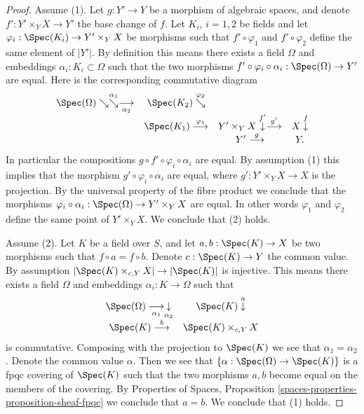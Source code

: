 \begin{proof}
Assume (1). Let $g : Y' \to Y$ be a morphism of algebraic
spaces, and denote $f' : Y' \times_Y X \to Y'$ the base change of $f$.
Let $K_i$, $i = 1, 2$ be fields and let
$\varphi_i : \Spec(K_i) \to Y' \times_Y X$ be morphisms
such that $f' \circ \varphi_1$ and $f' \circ \varphi_2$ define the
same element of $|Y'|$. By definition this means there exists a
field $\Omega$ and embeddings $\alpha_i : K_i \subset \Omega$ such that
the two morphisms
$f' \circ \varphi_i \circ \alpha_i : \Spec(\Omega) \to Y'$ are equal.
Here is the corresponding commutative diagram
$$
\begin{array}{cccc}\Spec(\Omega) \searrow\overset{\alpha_1}{\searrow}\underset{\alpha_2}{\longrightarrow} & \Spec(K_2) \overset{\varphi_2}{\searrow} &  &  \\  & \Spec(K_1) \overset{\varphi_1}{\longrightarrow} & Y' \times_Y X  \overset{f'}{\downarrow}\overset{g'}{\longrightarrow} & X \overset{f}{\downarrow} \\  &  & Y' \overset{g}{\longrightarrow} & Y.\end{array}
$$
In particular the compositions $g \circ f' \circ \varphi_i \circ \alpha_i$
are equal. By assumption (1) this implies that the morphism
$g' \circ \varphi_i \circ \alpha_i$ are equal, where $g' : Y' \times_Y X \to X$
is the projection. By the universal property of the fibre product we conclude
that the morphisms
$\varphi_i \circ \alpha_i : \Spec(\Omega) \to Y' \times_Y X$ are
equal. In other words $\varphi_1$ and $\varphi_2$ define the same point
of $Y' \times_Y X$. We conclude that (2) holds.

\medskip\noindent
Assume (2). Let $K$ be a field over $S$, and let $a, b : \Spec(K) \to X$
be two morphisms such that $f \circ a = f \circ b$. Denote
$c : \Spec(K) \to Y$ the common value. By assumption
$|\Spec(K) \times_{c, Y} X| \to |\Spec(K)|$ is injective.
This means there exists a field $\Omega$ and embeddings
$\alpha_i : K \to \Omega$ such that
$$
\begin{array}{cc}\Spec(\Omega) \underset{\alpha_1}{\longrightarrow}\underset{\alpha_2}{\downarrow} & \Spec(K) \overset{a}{\downarrow} \\ \Spec(K) \overset{b}{\longrightarrow} & \Spec(K) \times_{c, Y} X\end{array}
$$
is commutative. Composing with the projection to $\Spec(K)$
we see that $\alpha_1 = \alpha_2$. Denote the common value $\alpha$.
Then we see that $\{\alpha : \Spec(\Omega) \to \Spec(K)\}$
is a fpqc covering of $\Spec(K)$ such that the two morphisms
$a, b$ become equal on the members of the covering. By
Properties of Spaces, Proposition
\ref{spaces-properties-proposition-sheaf-fpqc}
we conclude that $a = b$. We conclude that (1) holds.


\end{proof}
